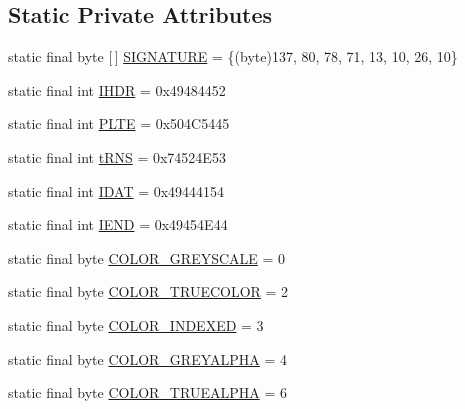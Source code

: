 \subsection*{Static Private Attributes}
\begin{DoxyCompactItemize}
\item 
static final byte \mbox{[}$\,$\mbox{]} \mbox{\hyperlink{classorg_1_1newdawn_1_1slick_1_1opengl_1_1_p_n_g_decoder_a150f394aab124e6e1fe24130c0ca6879}{S\+I\+G\+N\+A\+T\+U\+RE}} = \{(byte)137, 80, 78, 71, 13, 10, 26, 10\}
\item 
static final int \mbox{\hyperlink{classorg_1_1newdawn_1_1slick_1_1opengl_1_1_p_n_g_decoder_a884520c9bbbbb9c389cf679b1955f23c}{I\+H\+DR}} = 0x49484452
\item 
static final int \mbox{\hyperlink{classorg_1_1newdawn_1_1slick_1_1opengl_1_1_p_n_g_decoder_ab0ffecb5ed3291a27538566f8f26aa6e}{P\+L\+TE}} = 0x504\+C5445
\item 
static final int \mbox{\hyperlink{classorg_1_1newdawn_1_1slick_1_1opengl_1_1_p_n_g_decoder_a5f97fa38a4d7475be6a390f85ea1550d}{t\+R\+NS}} = 0x74524\+E53
\item 
static final int \mbox{\hyperlink{classorg_1_1newdawn_1_1slick_1_1opengl_1_1_p_n_g_decoder_a99571bca75a4f458cb1113006aa99075}{I\+D\+AT}} = 0x49444154
\item 
static final int \mbox{\hyperlink{classorg_1_1newdawn_1_1slick_1_1opengl_1_1_p_n_g_decoder_a5cc56faca9b4243d012ae613e31c23da}{I\+E\+ND}} = 0x49454\+E44
\item 
static final byte \mbox{\hyperlink{classorg_1_1newdawn_1_1slick_1_1opengl_1_1_p_n_g_decoder_aecc7370603e0c3bb70b761be9be7fd18}{C\+O\+L\+O\+R\+\_\+\+G\+R\+E\+Y\+S\+C\+A\+LE}} = 0
\item 
static final byte \mbox{\hyperlink{classorg_1_1newdawn_1_1slick_1_1opengl_1_1_p_n_g_decoder_a54e437f6d3679769a356402f7c86b763}{C\+O\+L\+O\+R\+\_\+\+T\+R\+U\+E\+C\+O\+L\+OR}} = 2
\item 
static final byte \mbox{\hyperlink{classorg_1_1newdawn_1_1slick_1_1opengl_1_1_p_n_g_decoder_a229a5a6a3ed73b28cbbe7d36bc78c4d1}{C\+O\+L\+O\+R\+\_\+\+I\+N\+D\+E\+X\+ED}} = 3
\item 
static final byte \mbox{\hyperlink{classorg_1_1newdawn_1_1slick_1_1opengl_1_1_p_n_g_decoder_a0d509a1ae82f19ef4da0c9f2e0671d77}{C\+O\+L\+O\+R\+\_\+\+G\+R\+E\+Y\+A\+L\+P\+HA}} = 4
\item 
static final byte \mbox{\hyperlink{classorg_1_1newdawn_1_1slick_1_1opengl_1_1_p_n_g_decoder_a96c509f7243118174cd8d25c50314713}{C\+O\+L\+O\+R\+\_\+\+T\+R\+U\+E\+A\+L\+P\+HA}} = 6
\end{DoxyCompactItemize}


